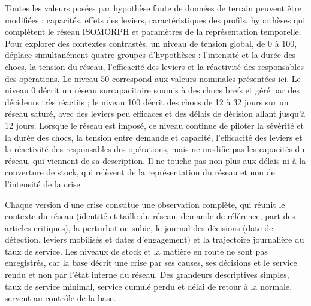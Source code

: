 Toutes les valeurs posées par hypothèse faute de données de terrain peuvent être modifiées : capacités, effets des leviers, caractéristiques des profils, hypothèses qui complètent le réseau ISOMORPH et paramètres de la représentation temporelle. Pour explorer des contextes contrastés, un niveau de tension global, de 0 à 100, déplace simultanément quatre groupes d'hypothèses : l'intensité et la durée des chocs, la tension du réseau, l'efficacité des leviers et la réactivité des responsables des opérations. Le niveau 50 correspond aux valeurs nominales présentées ici. Le niveau 0 décrit un réseau surcapacitaire soumis à des chocs brefs et géré par des décideurs très réactifs ; le niveau 100 décrit des chocs de 12 à 32 jours sur un réseau saturé, avec des leviers peu efficaces et des délais de décision allant jusqu'à 12 jours. Lorsque le réseau est imposé, ce niveau continue de piloter la sévérité et la durée des chocs, la tension entre demande et capacité, l'efficacité des leviers et la réactivité des responsables des opérations, mais ne modifie pas les capacités du réseau, qui viennent de sa description. Il ne touche pas non plus aux délais ni à la couverture de stock, qui relèvent de la représentation du réseau et non de l'intensité de la crise.

Chaque version d'une crise constitue une observation complète, qui réunit le contexte du réseau (identité et taille du réseau, demande de référence, part des articles critiques), la perturbation subie, le journal des décisions (date de détection, leviers mobilisés et dates d'engagement) et la trajectoire journalière du taux de service. Les niveaux de stock et la matière en route ne sont pas enregistrés, car la base décrit une crise par ses causes, ses décisions et le service rendu et non par l'état interne du réseau. Des grandeurs descriptives simples, taux de service minimal, service cumulé perdu et délai de retour à la normale, servent au contrôle de la base.
